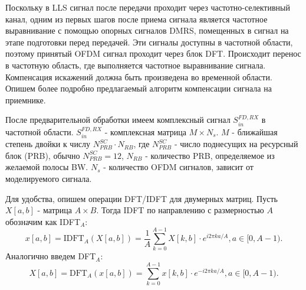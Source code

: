 Поскольку в LLS сигнал после передачи проходит через частотно-селективный
канал, одним из первых шагов после приема сигнала является частотное выравнивание с
помощью опорных сигналов DMRS, помещенных в сигнал на этапе
подготовки перед передачей. Эти сигналы доступны в частотной области,
поэтому принятый OFDM сигнал проходит через блок DFT. Происходит перенос в
частотную область, где выполняется частотное выравнивание сигнала.
Компенсация искажений должна быть произведена во временной области.
Опишем более подробно предлагаемый алгоритм компенсации сигнала на
приемнике.

После предварительной обработки имеем комплексный сигнал $S^{FD, RX}_{in}$
в частотной области. $S^{FD, RX}_{in}$ - комплексная матрица $M\times N_s$.
$M$ - ближайшая степень двойки к числу $N^{SC}_{PRB} \cdot N_{RB}$, где
$N^{SC}_{PRB}$ - число поднесущих на ресурсный блок (PRB), обычно
$N^{SC}_{PRB}=12$, $N_{RB}$ - количество PRB, определяемое из желаемой
полосы BW. $N_s$ - количество OFDM сигналов, зависит от моделируемого
сигнала.

Для удобства, опишем операции DFT/IDFT для двумерных матриц. Пусть $X[a,b]$ -
матрица $A\times B$. Тогда IDFT по направлению с размерностью $A$ обозначим
как IDFT$_A$:
\begin{equation}
    x[a,b] = \text{IDFT}_{A}\left(X[a,b]\right) =\frac{1}{A}\sum^{A-1}_{k=0} X[k,b] \cdot e^{i 2 \pi k a/A}, a \in [0, A-1).
\end{equation}
Аналогично введем DFT$_A$:
\begin{equation}
    X[a,b] = \text{DFT}_{A}\left(x[a,b]\right) =\sum^{A-1}_{k=0} x[k,b] \cdot e^{-i 2 \pi k a/A}, a \in [0, A-1).
\end{equation}


